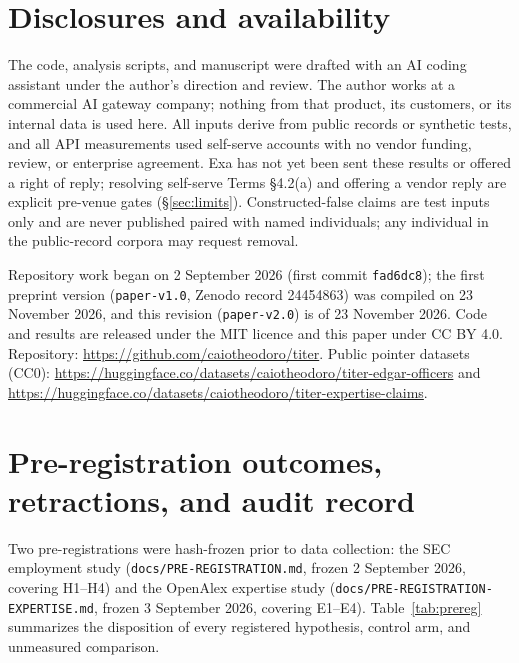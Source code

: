 \documentclass[11pt]{article}
\begin{document}
\section*{Disclosures and availability}

The code, analysis scripts, and manuscript were drafted with an AI coding assistant under the author's direction and review. The author works at a commercial AI gateway company; nothing from that product, its customers, or its internal data is used here. All inputs derive from public records or synthetic tests, and all API measurements used self-serve accounts with no vendor funding, review, or enterprise agreement. Exa has not yet been sent these results or offered a right of reply; resolving self-serve Terms \S4.2(a) and offering a vendor reply are explicit pre-venue gates (\S\ref{sec:limits}). Constructed-false claims are test inputs only and are never published paired with named individuals; any individual in the public-record corpora may request removal.

Repository work began on 2 September 2026 (first commit \texttt{fad6dc8}); the first preprint version (\texttt{paper-v1.0}, Zenodo record 24454863) was compiled on 23 November 2026, and this revision (\texttt{paper-v2.0}) is of 23 November 2026. Code and results are released under the MIT licence and this paper under CC BY 4.0. Repository: \url{https://github.com/caiotheodoro/titer}. Public pointer datasets (CC0): \url{https://huggingface.co/datasets/caiotheodoro/titer-edgar-officers} and \url{https://huggingface.co/datasets/caiotheodoro/titer-expertise-claims}.


{\footnotesize\setlength{\bibsep}{0pt}}

\appendix

\section{Pre-registration outcomes, retractions, and audit record}
\label{app:prereg}

Two pre-registrations were hash-frozen prior to data collection: the SEC employment study (\texttt{docs/PRE-REGISTRATION.md}, frozen 2 September 2026, covering H1--H4) and the OpenAlex expertise study (\texttt{docs/PRE-REGISTRATION-EXPERTISE.md}, frozen 3 September 2026, covering E1--E4). Table~\ref{tab:prereg} summarizes the disposition of every registered hypothesis, control arm, and unmeasured comparison.
\end{document}
